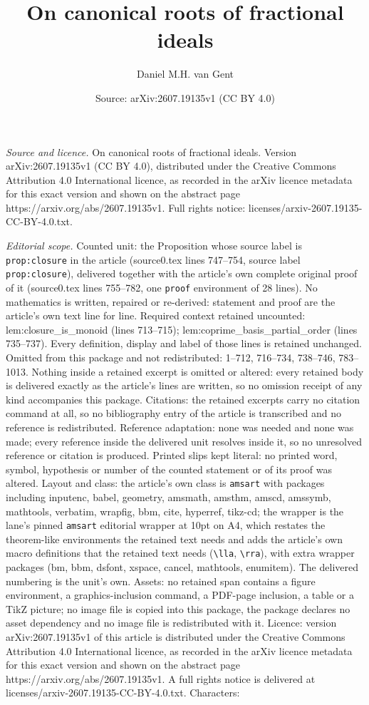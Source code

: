 \documentclass[10pt,a4paper]{amsart}
\title[On canonical roots of fractional ideals]{On canonical roots of fractional ideals}
\author{Daniel M.H. van Gent}
\date{Source: arXiv:2607.19135v1 (CC BY 4.0)}
\begin{document}
\maketitle

\noindent\emph{Source and licence.} On canonical roots of fractional ideals. Version arXiv:2607.19135v1 (CC BY 4.0), distributed under the Creative Commons Attribution 4.0 International licence, as recorded in the arXiv licence metadata for this exact version and shown on the abstract page https://arxiv.org/abs/2607.19135v1. Full rights notice: licenses/arxiv-2607.19135-CC-BY-4.0.txt.\par\smallskip

\noindent\textit{Editorial scope.} Counted unit: the Proposition whose source label is \texttt{prop:closure} in the article (source0.tex lines 747--754, source label \texttt{prop:closure}), delivered together with the article's own complete original proof of it (source0.tex lines 755--782, one \texttt{proof} environment of 28 lines). No mathematics is written, repaired or re-derived: statement and proof are the article's own text line for line. Required context retained uncounted: lem:closure\_is\_monoid (lines 713--715); lem:coprime\_basis\_partial\_order (lines 735--737). Every definition, display and label of those lines is retained unchanged. Omitted from this package and not redistributed: 1--712, 716--734, 738--746, 783--1013. Nothing inside a retained excerpt is omitted or altered: every retained body is delivered exactly as the article's lines are written, so no omission receipt of any kind accompanies this package. Citations: the retained excerpts carry no citation command at all, so no bibliography entry of the article is transcribed and no reference is redistributed. Reference adaptation: none was needed and none was made; every reference inside the delivered unit resolves inside it, so no unresolved reference or citation is produced. Printed slips kept literal: no printed word, symbol, hypothesis or number of the counted statement or of its proof was altered. Layout and class: the article's own class is \texttt{amsart} with packages including inputenc, babel, geometry, amsmath, amsthm, amscd, amssymb, mathtools, verbatim, wrapfig, bbm, cite, hyperref, tikz-cd; the wrapper is the lane's pinned \texttt{amsart} editorial wrapper at 10pt on A4, which restates the theorem-like environments the retained text needs and adds the article's own macro definitions that the retained text needs (\texttt{\textbackslash lla}, \texttt{\textbackslash rra}), with extra wrapper packages (bm, bbm, dsfont, xspace, cancel, mathtools, enumitem). The delivered numbering is the unit's own. Assets: no retained span contains a figure environment, a graphics-inclusion command, a PDF-page inclusion, a table or a TikZ picture; no image file is copied into this package, the package declares no asset dependency and no image file is redistributed with it. Licence: version arXiv:2607.19135v1 of this article is distributed under the Creative Commons Attribution 4.0 International licence, as recorded in the arXiv licence metadata for this exact version and shown on the abstract page https://arxiv.org/abs/2607.19135v1. A full rights notice is delivered at licenses/arxiv-2607.19135-CC-BY-4.0.txt. Characters: 
\end{document}
